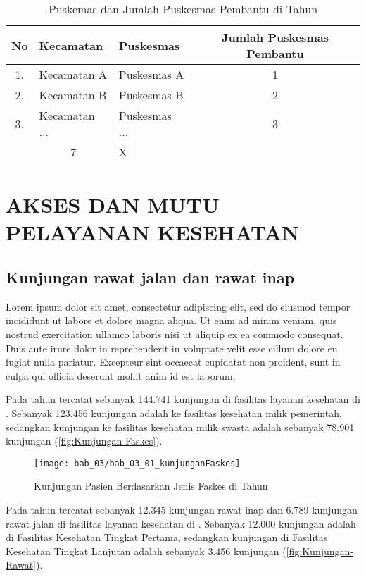 \begin{table}[!ht]
\caption{Puskemas dan Jumlah Puskesmas Pembantu di \namaKabupaten Tahun \tP}
\label{tab:Puskemas-dan-Pustu}
\centering{}%

\begin{tabular}{cllc}
\toprule
No & Kecamatan & \multicolumn{1}{l}{Puskesmas} & Jumlah Puskesmas Pembantu\\
\midrule
1. & Kecamatan A & Puskesmas A & 1\\
\rowcolor{black!20}2. & Kecamatan B & Puskesmas B & 2\\
3. & Kecamatan ... & Puskesmas ... & 3\\
\midrule
\rowcolor{blue!20}\multicolumn{2}{c}{Jumlah} & \multicolumn{1}{c}{7} & X\\
\bottomrule
\end{tabular}
\end{table}

\section{AKSES DAN MUTU PELAYANAN KESEHATAN}
\subsection{Kunjungan rawat jalan dan rawat inap}
Lorem ipsum dolor sit amet, consectetur adipiscing elit, sed do eiusmod tempor incididunt ut labore et dolore magna aliqua. Ut enim ad minim veniam, quis nostrud exercitation ullamco laboris nisi ut aliquip ex ea commodo consequat. Duis aute irure dolor in reprehenderit in voluptate velit esse cillum dolore eu fugiat nulla pariatur. Excepteur sint occaecat cupidatat non proident, sunt in culpa qui officia deserunt mollit anim id est laborum.

Pada tahun \tP tercatat sebanyak 144.741 kunjungan di fasilitas layanan kesehatan di \namaKabupaten. Sebanyak 123.456 kunjungan adalah ke fasilitas kesehatan milik pemerintah, sedangkan kunjungan ke fasilitas kesehatan milik swasta adalah sebanyak 78.901 kunjungan (\autoref{fig:Kunjungan-Faskes}).

\begin{figure}[H]
    \centering{}
    \texttt{[image: bab\_03/bab\_03\_01\_kunjunganFaskes]}
    \caption{Kunjungan Pasien Berdasarkan Jenis Faskes di \namaKabupaten Tahun \tP}
    \label{fig:Kunjungan-Faskes}
\end{figure}

Pada tahun \tP tercatat sebanyak 12.345 kunjungan rawat inap dan 6.789 kunjungan rawat jalan di fasilitas layanan kesehatan di \namaKabupaten. Sebanyak 12.000 kunjungan adalah di Fasilitas Kesehatan Tingkat Pertama, sedangkan kunjungan di Fasilitas Kesehatan Tingkat Lanjutan adalah sebanyak 3.456 kunjungan (\autoref{fig:Kunjungan-Rawat}).

